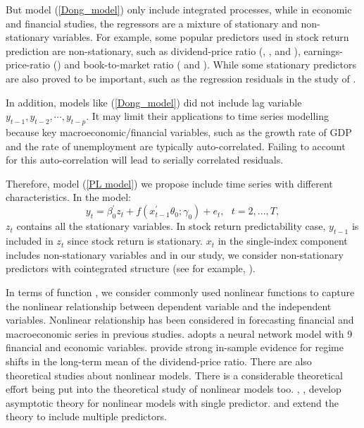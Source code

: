 \documentclass[a4paper,12pt,times,numbered,print,index]{report}
\numberwithin{equation}{section}
\begin{document}
But model (\ref{Dong_model}) only include integrated processes, while in economic and financial studies, the regressors are a mixture of stationary and non-stationary variables. For example, some popular predictors used in stock return prediction are non-stationary, such as dividend-price ratio (\cite{fama1989business}, \cite{cochrane2008dog}, and \cite{lettau2008reconciling}), earnings-price-ratio (\cite{campbell1988stock}) and book-to-market ratio (\cite{kothari1997book} and \cite{pontiff1998book}). While some stationary predictors are also proved to be important, such as the regression residuals in the study of \cite{lettau2001consumption}. 

In addition, models like (\ref{Dong_model}) did not include lag variable $y_{t-1}, y_{t-2}, \cdots, y_{t-p}$. It may limit their applications to time series modelling because key macroeconomic/financial variables, such as the growth rate of GDP and the rate of unemployment are typically auto-correlated. Failing to account for this auto-correlation will lead to serially correlated residuals. 

Therefore, model (\ref{PL model}) we propose include time series with different characteristics. In the model:
$$
y_{t} = \beta_0^{\prime} z_t + f\left( x_{t-1}^{\prime }\theta_0; \gamma_0\right) +e_{t},\ \ \
	t=2,...,T,
$$
$z_t$ contains all the stationary variables. In stock return predictability case, $y_{t-1}$ is included in $z_t$ since stock return is stationary. $x_t$ in the single-index component includes non-stationary variables and in our study, we consider non-stationary predictors with cointegrated structure (see for example, \cite{zhou2018semiparametric}). 

In terms of function , we consider commonly used nonlinear functions to capture the nonlinear relationship between dependent variable and the independent variables. Nonlinear relationship has been considered in forecasting financial and macroeconomic series in previous studies. \cite{qi1999nonlinear} adopts a neural network model with 9 financial and economic variables. \cite{lettau2008reconciling} provide strong in-sample evidence for regime shifts in the long-term mean of the dividend-price ratio. There are also theoretical studies about nonlinear models.  There is a considerable theoretical effort being put into the theoretical study of nonlinear models too. \cite{park1999asymptotics}, \cite{park2000nonstationary}, \cite{park2001nonlinear} develop asymptotic theory for nonlinear models with single predictor. \cite{chang2001nonlinear} and \cite{chang2003index} extend the theory to include multiple predictors.  
\end{document}
